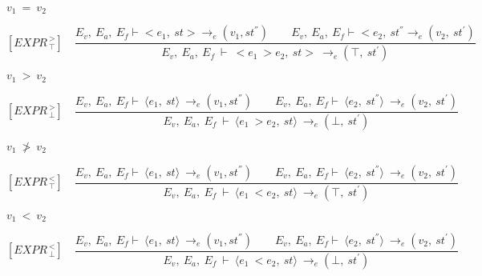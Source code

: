 	
	\begin{math}		
		v_1 \ = \ v_2		
	\end{math} 
	
	
	
	
	
	
	
	
	\[	
	[EXPR^{\ >}_{\ \top}] \quad	
	\dfrac{E_v, \ E_a, \ E_f \vdash <e_1, \ st> \rightarrow_e (v_1, st^{''}) \qquad E_v, \ E_a, \ E_f \vdash <e_2, \ st^{''} \rightarrow_e (v_2, \ st^{'})}{E_v, \ E_a, \ E_f \ \vdash \ <e_1 \ > e_2, \ st> \ \rightarrow_e (\top, \ st^{'})}	
	\]
	
	
	\begin{math}		
		v_1 \ > \ v_2		
	\end{math} 
	
	
	
	
	
	\newcommand{\exprtrans}[5][E_v, E_a,E_f]{#1\vdash \langle #2, #3 \rangle \mathrel{\to_e} (#4 , #5)}
	
	
	
	
	
	\[	
	[EXPR^{\ >}_{\ \bot}] \quad	
	\dfrac{E_v, \ E_a, \ E_f \vdash \ \langle e_1, \ st \rangle \ \rightarrow_e (v_1, st^{''}) \qquad E_v, \ E_a, \ E_f \vdash \ \langle e_2, \ st^{''} \rangle \ \rightarrow_e (v_2, \ st^{'})}{E_v, \ E_a, \ E_f \ \vdash \ \langle e_1 \ > e_2, \ st \rangle \ \rightarrow_e (\bot, \ st^{'})}
	\]
	
	
	\begin{math}		
		v_1 \ \not> \ v_2		
	\end{math} 
	
	
	
	
	
	\[	
	[EXPR^{\ <}_{\ \top}] \quad	
	\dfrac{E_v, \ E_a, \ E_f \vdash \ \langle e_1, \ st \rangle \ \rightarrow_e (v_1, st^{''}) \qquad E_v, \ E_a, \ E_f \vdash \ \langle e_2, \ st^{''} \rangle \ \rightarrow_e (v_2, \ st^{'})}{E_v, \ E_a, \ E_f \ \vdash \ \langle e_1 \ < e_2, \ st \rangle \ \rightarrow_e (\top, \ st^{'})}
	\]
	
	
	\begin{math}		
		v_1 \ < \ v_2		
	\end{math} 
	
	
	
	
	
	
	
	
	\[	
	[EXPR^{\ <}_{\ \bot}] \quad	
	\dfrac{E_v, \ E_a, \ E_f \vdash \ \langle e_1, \ st \rangle \ \rightarrow_e (v_1, st^{''}) \qquad E_v, \ E_a, \ E_f \vdash \ \langle e_2, \ st^{''} \rangle \ \rightarrow_e (v_2, \ st^{'})}{E_v, \ E_a, \ E_f \ \vdash \ \langle e_1 \ < e_2, \ st \rangle \ \rightarrow_e (\bot, \ st^{'})}	
	\]
	
